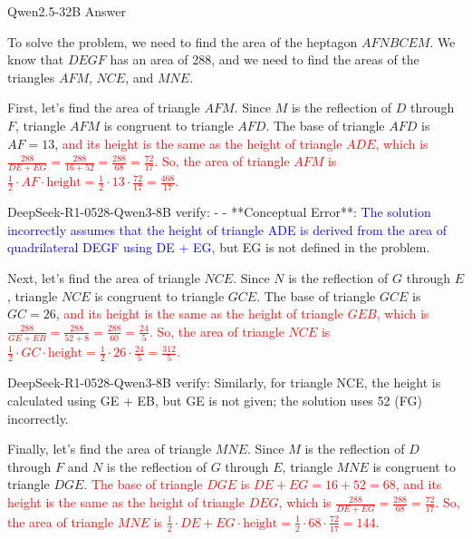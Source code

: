 \begin{answerbox}{Qwen2.5-32B Answer}

To solve the problem, we need to find the area of the heptagon $AFNBCEM$. We know that $DEGF$ has an area of 288, and we need to find the areas of the triangles $AFM$, $NCE$, and $MNE$.

First, let's find the area of triangle $AFM$. Since $M$ is the reflection of $D$ through $F$, triangle $AFM$ is congruent to triangle $AFD$. The base of triangle $AFD$ is $AF=13$, \textcolor{red}{and its height is the same as the height of triangle $ADE$, which is $\frac{288}{DE+EG}=\frac{288}{16+52}=\frac{288}{68}=\frac{72}{17}$. So, the area of triangle $AFM$ is $\frac{1}{2}\cdot AF\cdot\text{height}=\frac{1}{2}\cdot 13\cdot\frac{72}{17}=\frac{468}{17}$.}

\begin{tcolorbox}[
    colback=blue!5!white,         %
    colframe=blue!40!white,       %
]
DeepSeek-R1-0528-Qwen3-8B verify: - - **Conceptual Error**: \textcolor{blue}{The solution incorrectly assumes that the height of triangle ADE is derived from the area of quadrilateral DEGF using DE + EG}, but EG is not defined in the problem. 
\end{tcolorbox}

Next, let's find the area of triangle $NCE$. Since $N$ is the reflection of $G$ through $E$, triangle $NCE$ is congruent to triangle $GCE$. The base of triangle $GCE$ is $GC=26$, \textcolor{red}{and its height is the same as the height of triangle $GEB$, which is $\frac{288}{GE+EB}=\frac{288}{52+8}=\frac{288}{60}=\frac{24}{5}$. So, the area of triangle $NCE$ is $\frac{1}{2}\cdot GC\cdot\text{height}=\frac{1}{2}\cdot 26\cdot\frac{24}{5}=\frac{312}{5}$.}

\begin{tcolorbox}[
    colback=blue!5!white,         %
    colframe=blue!40!white,       %
]
DeepSeek-R1-0528-Qwen3-8B verify: Similarly, for triangle NCE, the height is calculated using GE + EB, but GE is not given; the solution uses 52 (FG) incorrectly. 
\end{tcolorbox}

Finally, let's find the area of triangle $MNE$. Since $M$ is the reflection of $D$ through $F$ and $N$ is the reflection of $G$ through $E$, triangle $MNE$ is congruent to triangle $DGE$. \textcolor{red}{The base of triangle $DGE$ is $DE+EG=16+52=68$, and its height is the same as the height of triangle $DEG$, which is $\frac{288}{DE+EG}=\frac{288}{68}=\frac{72}{17}$. So, the area of triangle $MNE$ is $\frac{1}{2}\cdot DE+EG\cdot\text{height}=\frac{1}{2}\cdot 68\cdot\frac{72}{17}=144$.}


\end{answerbox}
